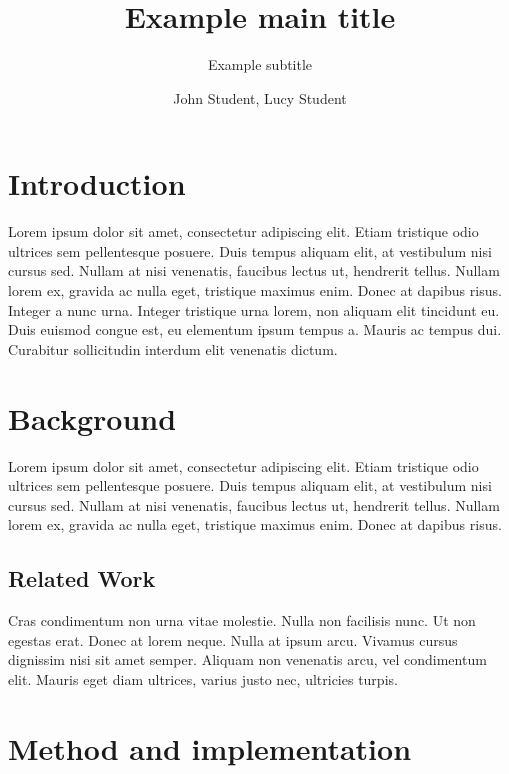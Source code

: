\documentclass[11pt, a4paper]{resources/JTH}
\title{Example main title}
\subtitle{Example subtitle}
\author{John Student, Lucy Student}
\begin{document}
\maketitle


\begingroup
    \setlength{\parskip}{0pt} %
    \tableofcontents
\endgroup

\newpage


\section{Introduction}
    Lorem ipsum \cite{Breiman_1996} dolor sit amet, consectetur adipiscing elit. Etiam tristique odio ultrices sem pellentesque posuere. Duis tempus aliquam elit, at vestibulum nisi cursus sed. Nullam at nisi venenatis, faucibus lectus ut, hendrerit tellus. Nullam lorem ex, gravida ac nulla eget, tristique maximus enim. Donec at dapibus risus. Integer a nunc urna. Integer tristique urna lorem, non aliquam elit tincidunt eu. Duis euismod congue est, eu elementum ipsum tempus a. Mauris ac tempus dui. Curabitur sollicitudin interdum elit venenatis dictum. \citep{davidson1996c}

\section{Background}
    
    Lorem ipsum dolor sit amet, consectetur adipiscing elit. Etiam tristique odio ultrices sem pellentesque posuere. Duis tempus aliquam elit, at vestibulum nisi cursus sed. Nullam at nisi venenatis, faucibus lectus ut, hendrerit tellus. Nullam lorem ex, gravida ac nulla eget, tristique maximus enim. Donec at dapibus risus. \citep{freeman2002example}

    \subsection{Related Work}

        Cras condimentum non urna vitae molestie. Nulla non facilisis nunc. Ut non egestas erat. Donec at lorem neque. Nulla at ipsum arcu. Vivamus cursus dignissim nisi sit amet semper. Aliquam non venenatis arcu, vel condimentum elit. Mauris eget diam ultrices, varius justo nec, ultricies turpis. \citep{zloof1977query}

\section{Method and implementation}
\end{document}
